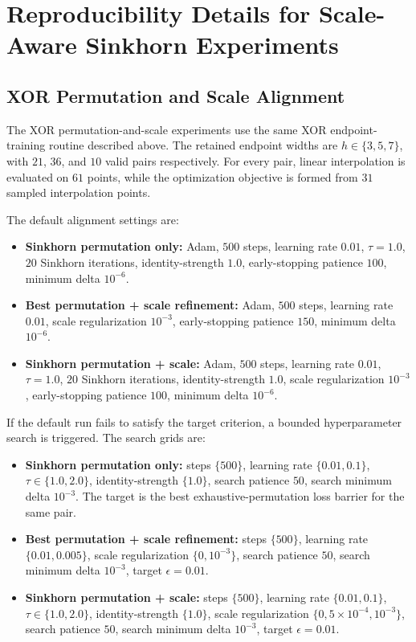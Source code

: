 \documentclass[11pt,a4paper]{report}
\begin{document}
\section{Reproducibility Details for Scale-Aware Sinkhorn Experiments}
\label{app:sinkhorn_scale_repro}

\subsection{XOR Permutation and Scale Alignment}

The XOR permutation-and-scale experiments use the same XOR endpoint-training routine described above. The retained endpoint widths are \(h \in \{3,5,7\}\), with \(21\), \(36\), and \(10\) valid pairs respectively. For every pair, linear interpolation is evaluated on \(61\) points, while the optimization objective is formed from \(31\) sampled interpolation points.

The default alignment settings are:
\begin{itemize}
    \item \textbf{Sinkhorn permutation only:} Adam, \(500\) steps, learning rate \(0.01\), \(\tau=1.0\), \(20\) Sinkhorn iterations, identity-strength \(1.0\), early-stopping patience \(100\), minimum delta \(10^{-6}\).
    \item \textbf{Best permutation + scale refinement:} Adam, \(500\) steps, learning rate \(0.01\), scale regularization \(10^{-3}\), early-stopping patience \(150\), minimum delta \(10^{-6}\).
    \item \textbf{Sinkhorn permutation + scale:} Adam, \(500\) steps, learning rate \(0.01\), \(\tau=1.0\), \(20\) Sinkhorn iterations, identity-strength \(1.0\), scale regularization \(10^{-3}\), early-stopping patience \(100\), minimum delta \(10^{-6}\).
\end{itemize}

If the default run fails to satisfy the target criterion, a bounded hyperparameter search is triggered. The search grids are:
\begin{itemize}
    \item \textbf{Sinkhorn permutation only:} steps \(\{500\}\), learning rate \(\{0.01,0.1\}\), \(\tau \in \{1.0,2.0\}\), identity-strength \(\{1.0\}\), search patience \(50\), search minimum delta \(10^{-3}\). The target is the best exhaustive-permutation loss barrier for the same pair.
    \item \textbf{Best permutation + scale refinement:} steps \(\{500\}\), learning rate \(\{0.01,0.005\}\), scale regularization \(\{0,10^{-3}\}\), search patience \(50\), search minimum delta \(10^{-3}\), target \(\epsilon=0.01\).
    \item \textbf{Sinkhorn permutation + scale:} steps \(\{500\}\), learning rate \(\{0.01,0.1\}\), \(\tau \in \{1.0,2.0\}\), identity-strength \(\{1.0\}\), scale regularization \(\{0,5\times10^{-4},10^{-3}\}\), search patience \(50\), search minimum delta \(10^{-3}\), target \(\epsilon=0.01\).
\end{itemize}
\end{document}
